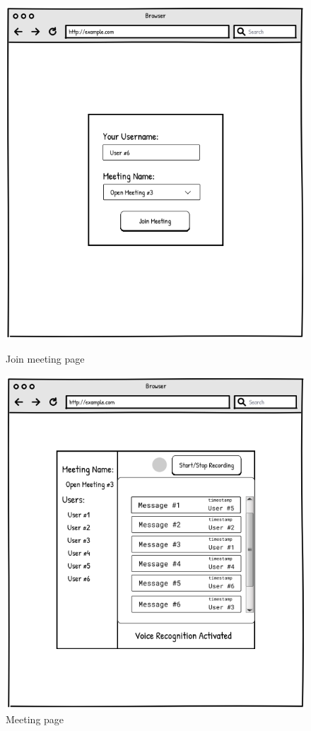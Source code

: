 \documentclass{article}
\begin{document}
\begin{figure}[H]
\centering
\begin{minipage}{.5\textwidth}
  \centering
  \includegraphics[width=0.97\linewidth]{img/join.png}
  \caption{Join meeting page}
  \label{fig:join}
\end{minipage}%
\begin{minipage}{.5\textwidth}
  \centering
  \includegraphics[width=0.97\linewidth]{img/meeting.png}
  \caption{Meeting page}
  \label{fig:meeting}
\end{minipage}
\end{figure}
\end{document}
